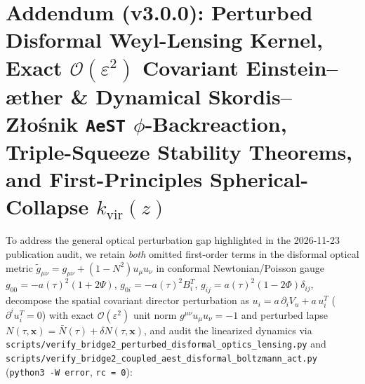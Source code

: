\documentclass[11pt,a4paper]{article}
\begin{document}
\section{Addendum (v3.0.0): Perturbed Disformal Weyl-Lensing Kernel, Exact \texorpdfstring{$\mathcal{O}(\varepsilon^2)$}{O(eps2)} Covariant Einstein--\texorpdfstring{\ae{}}{ae}ther \& Dynamical Skordis--Z\texorpdfstring{{\l}o\'s}{los}nik \texorpdfstring{\texttt{AeST}}{AeST} \texorpdfstring{$\phi$}{phi}-Backreaction, Triple-Squeeze Stability Theorems, and First-Principles Spherical-Collapse \texorpdfstring{$k_{\mathrm{vir}}(z)$}{k\_vir(z)}}
\label{sec:v21-bridge2}
To address the general optical perturbation gap highlighted in the 2026-11-23 publication audit, we retain \emph{both} omitted first-order terms in the disformal optical metric $\tilde{g}_{\mu\nu} = g_{\mu\nu} + (1 - N^2) u_\mu u_\nu$ in conformal Newtonian/Poisson gauge $g_{00} = -a(\tau)^2(1 + 2\Psi)$, $g_{0i} = -a(\tau)^2 B_i^T$, $g_{ij} = a(\tau)^2(1 - 2\Phi)\delta_{ij}$, decompose the spatial covariant director perturbation as $u_i = a\,\partial_i V_u + a\,u_i^T$ ($\partial^i u_i^T = 0$) with exact $\mathcal{O}(\varepsilon^2)$ unit norm $g^{\mu\nu} u_\mu u_\nu = -1$ and perturbed lapse $N(\tau,\mathbf{x}) = \bar{N}(\tau) + \delta N(\tau,\mathbf{x})$, and audit the linearized dynamics via \texttt{scripts/\allowbreak verify\_\allowbreak bridge2\_\allowbreak perturbed\_\allowbreak disformal\_\allowbreak optics\_\allowbreak lensing.py} and \texttt{scripts/\allowbreak verify\_\allowbreak bridge2\_\allowbreak coupled\_\allowbreak aest\_\allowbreak disformal\_\allowbreak boltzmann\_\allowbreak act.py} (\texttt{python3 -W error}, \texttt{rc = 0}):
\end{document}
